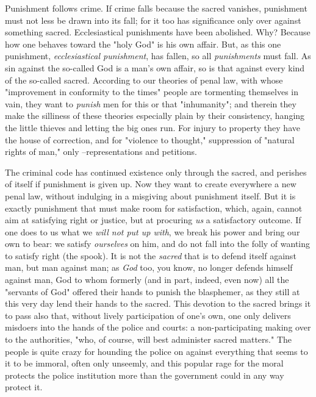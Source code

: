 Punishment follows crime. If crime falls because the sacred vanishes, 
punishment must not less be drawn into its fall; for it too has significance 
only over against something sacred. Ecclesiastical punishments have been 
abolished. Why? Because how one behaves toward the "{}holy God"{} is his own 
affair. But, as this one punishment, \textit{ecclesiastical punishment}, has 
fallen, so all \textit{punishments} must fall. As sin against the so-called 
God is a man's own affair, so is that against every kind of the so-called 
sacred. According to our theories of penal law, with whose "{}improvement in 
conformity to the times"{} people are tormenting themselves in vain, they want 
to \textit{punish} men for this or that "{}inhumanity"{}; and therein they 
make the silliness of these theories especially plain by their consistency, 
hanging the little thieves and letting the big ones run. For injury to 
property they have the house of correction, and for "{}violence to thought,"{} 
suppression of "{}natural rights of man,"{} only --representations and 
petitions.

The criminal code has continued existence only through the sacred, and 
perishes of itself if punishment is given up. Now they want to create 
everywhere a new penal law, without indulging in a misgiving about punishment 
itself. But it is exactly punishment that must make room for satisfaction, 
which, again, cannot aim at satisfying right or justice, but at procuring 
\textit{us} a satisfactory outcome. If one does to us what we \textit{will not 
put up with}, we break his power and bring our own to bear: we satisfy 
\textit{ourselves} on him, and do not fall into the folly of wanting to 
satisfy right (the spook). It is not the \textit{sacred} that is to defend 
itself against man, but man against man; as \textit{God} too, you know, no 
longer defends himself against man, God to whom formerly (and in part, indeed, 
even now) all the "{}servants of God"{} offered their hands to punish the 
blasphemer, as they still at this very day lend their hands to the sacred. 
This devotion to the sacred brings it to pass also that, without lively 
participation of one's own, one only delivers misdoers into the hands of the 
police and courts: a non-participating making over to the authorities, "{}who, 
of course, will best administer sacred matters."{} The people is quite crazy 
for hounding the police on against everything that seems to it to be immoral, 
often only unseemly, and this popular rage for the moral protects the police 
institution more than the government could in any way protect it.

